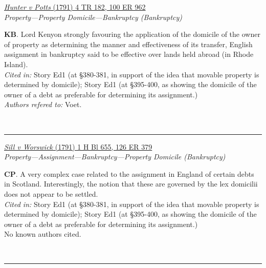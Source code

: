 \documentclass[twoside]{article}
\begin{document}
        \begin{small}
        \begin{center}
        \href{https://heinonline.org/HOL/P?h=hein.engrep/engrf0100&i=966}{\textit{Hunter v Potts} (1791) 4 TR 182, 100 ER 962} \label{121} \\ 
\textit{Property---Property Domicile---Bankruptcy (Bankruptcy)}\\
        \end{center}
        \textbf{KB}. Lord Kenyon strongly favouring the application of the domicile of the owner of property as determining the manner and effectiveness of its transfer, English assignment in bankruptcy said to be effective over lands held abroad (in Rhode Island).\\\textit{Cited in: }Story Ed1 (at §380-381, in support of the idea that movable property is determined by domicile); Story Ed1 (at §395-400, as showing the domicile of the owner of a debt as preferable for determining its assignment.)\\\textit{Authors refered to: }Voet.
        \end{small}\\
        \rule{\textwidth}{0.5pt}
        

        \begin{small}
        \begin{center}
        \href{https://heinonline.org/HOL/P?h=hein.engrep/engrg0126&i=383}{\textit{Sill v Worswick} (1791) 1 H Bl 655, 126 ER 379} \label{129} \\ 
\textit{Property---Assignment---Bankruptcy---Property Domicile (Bankruptcy)}\\
        \end{center}
        \textbf{CP}. A very complex case related to the assignment in England of certain debts in Scotland. Interestingly, the notion that these are governed by the lex domicilii does not appear to be settled.\\\textit{Cited in: }Story Ed1 (at §380-381, in support of the idea that movable property is determined by domicile); Story Ed1 (at §395-400, as showing the domicile of the owner of a debt as preferable for determining its assignment.)\\No known authors cited.
        \end{small}\\
        \rule{\textwidth}{0.5pt}
        
\end{document}
